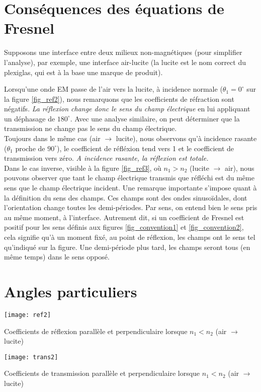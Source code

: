 \section{Conséquences des équations de Fresnel}
Supposons une interface entre deux milieux non-magnétiques (pour simplifier l'analyse), par exemple, une interface air-lucite (la lucite est le nom correct du plexiglas, qui est à la base une marque de produit).

Lorsqu'une onde EM passe de l'air vers la lucite, à incidence normale ($\theta_1=0^\circ$ sur la figure \ref{fig_ref2}), nous remarquons que les coefficients de réfraction sont négatifs. \textit{La réflexion change donc le sens du champ électrique} en lui appliquant un déphasage de $180^\circ$. Avec une analyse similaire, on peut déterminer que la transmission ne change pas le sens du champ électrique.\\
Toujours dans le même cas (air $\rightarrow$ lucite), nous observons qu'à incidence rasante ($\theta_1$ proche de $90^\circ$), le coefficient de réfléxion tend vers 1 et le coefficient de transmission vers zéro. \textit{A incidence rasante, la réflexion est totale.}\\

Dans le cas inverse, visible à la figure \ref{fig_ref3}, où $n_1>n_2$ (lucite $\rightarrow$ air), nous pouvons observer que tant le champ électrique transmis que réfléchi est du même sens que le champ électrique incident. Une remarque importante s'impose quant à la définition du sens des champs. Ces champs sont des ondes sinusoïdales, dont l'orientation change toutes les demi-périodes. Par sens, on entend bien le sens pris au même moment, à l'interface. Autrement dit, si un coefficient de Fresnel est positif pour les sens définis aux figures \ref{fig_convention1} et \ref{fig_convention2}, cela signifie qu'à un moment fixé, au point de réflexion, les champs ont le sens tel qu'indiqué sur la figure. Une demi-période plus tard, les champs seront tous (en même temps) dans le sens opposé. 

\section{Angles particuliers}
\begin{marginfigure}%
	\texttt{[image: ref2]}
	\caption{Coefficients de réflexion parallèle et perpendiculaire lorsque $n_1<n_2$ (air $\rightarrow$ lucite)}
	\label{fig_ref2}
\end{marginfigure} 
\begin{marginfigure}%
	\texttt{[image: trans2]}
	\caption{Coefficients de transmission parallèle et perpendiculaire lorsque $n_1<n_2$ (air $\rightarrow$ lucite)}
	\label{fig_trans2}
\end{marginfigure} 

